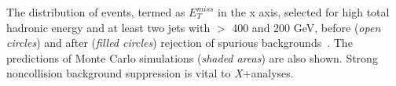 
The \MET distribution of events, termed as $E_T^{miss}$ in the x axis, selected for high total
hadronic energy and at least two jets with \pt{} $>$ 400 and 200
GeV, before (\textit{open circles}) and after (\textit{filled circles}) rejection of
spurious \MET backgrounds~\cite{CMS-PAS-JME-16-004}. The
predictions of Monte Carlo  simulations (\textit{shaded areas}) are also shown. Strong
noncollision background suppression is vital to \textit{X}+\MET analyses.


